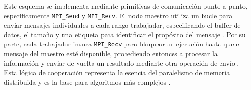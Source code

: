 Este esquema se implementa mediante primitivas de comunicación punto a punto, específicamente \texttt{MPI\_Send} y \texttt{MPI\_Recv}. El nodo maestro utiliza un bucle para enviar mensajes individuales a cada rango trabajador, especificando el buffer de datos, el tamaño y una etiqueta para identificar el propósito del mensaje \cite{ref9_cristian_Gropp1996, ref1_cristian_MPIStandard41}. Por su parte, cada trabajador invoca \texttt{MPI\_Recv} para bloquear su ejecución hasta que el mensaje del maestro esté disponible, procediendo entonces a procesar la información y enviar de vuelta un resultado mediante otra operación de envío \cite{ref9_cristian_Gropp1996, ref1_cristian_MPIStandard41}. Esta lógica de cooperación representa la esencia del paralelismo de memoria distribuida y es la base para algoritmos más complejos \cite{ref9_cristian_Gropp1996, ref8_cristian_Nielsen2016}.